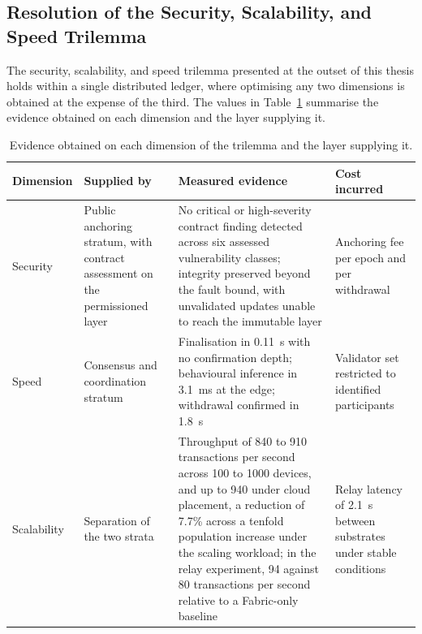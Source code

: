 \subsection{Resolution of the Security, Scalability, and Speed Trilemma}
\label{sec:eval-trilemma}
The security, scalability, and speed trilemma presented at the outset of this thesis holds within a single distributed ledger, where optimising any two dimensions is obtained at the expense of the third. The values in Table~\ref{tab:trilemma-close} summarise the evidence obtained on each dimension and the layer supplying it.

\begin{table}[!htbp]
  \centering
  \footnotesize
  \setlength{\tabcolsep}{5pt}
  \renewcommand{\arraystretch}{1.3}
  \caption{Evidence obtained on each dimension of the trilemma and the layer supplying it.}
  \label{tab:trilemma-close}
  \begin{tabularx}{\textwidth}{@{}
      >{\raggedright\arraybackslash}p{2.0cm}
      >{\raggedright\arraybackslash}p{3.2cm}
      >{\raggedright\arraybackslash}X
      >{\raggedright\arraybackslash}p{2.4cm}@{}}
    \toprule
    \textbf{Dimension} & \textbf{Supplied by} & \textbf{Measured evidence} & \textbf{Cost incurred} \\
    \midrule
    Security
      & Public anchoring stratum, with contract assessment on the permissioned layer
      & No critical or high-severity contract finding detected across six assessed vulnerability classes; integrity preserved beyond the fault bound, with unvalidated updates unable to reach the immutable layer
      & Anchoring fee per epoch and per withdrawal \\
    Speed
      & Consensus and coordination stratum
      & Finalisation in 0.11~s with no confirmation depth; behavioural inference in 3.1~ms at the edge; withdrawal confirmed in 1.8~s
      & Validator set restricted to identified participants \\
    Scalability
      & Separation of the two strata
      & Throughput of 840 to 910 transactions per second across 100 to 1000 devices, and up to 940 under cloud placement, a reduction of 7.7\% across a tenfold population increase under the scaling workload; in the relay experiment, 94 against 80 transactions per second relative to a Fabric-only baseline
      & Relay latency of 2.1~s between substrates under stable conditions \\
    \bottomrule
  \end{tabularx}
\end{table}

